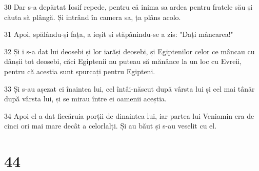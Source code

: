 \par 30 Dar s-a depărtat Iosif repede, pentru că inima sa ardea pentru fratele său și căuta să plângă. Și intrând în camera sa, ța plâns acolo.
\par 31 Apoi, spălându-și fața, a ieșit și stăpânindu-se a zis: "Dați mâncarea!"
\par 32 Și i s-a dat lui deosebi și lor iarăși deosebi, și Egiptenilor celor ce mâncau cu dânșii tot deosebi, căci Egiptenii nu puteau să mănânce la un loc cu Evreii, pentru că aceștia sunt spurcați pentru Egipteni.
\par 33 Și s-au așezat ei înaintea lui, cel întâi-născut după vârsta lui și cel mai tânăr după vârsta lui, și se mirau între ei oamenii aceștia.
\par 34 Apoi el a dat fiecăruia porții de dinaintea lui, iar partea lui Veniamin era de cinci ori mai mare decât a celorlalți. Și au băut și s-au veselit cu el.

\chapter{44}

